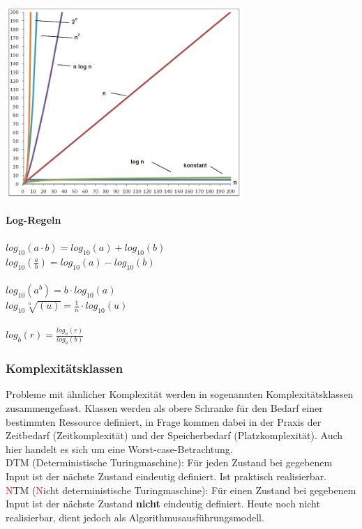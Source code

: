 \begin{minipage}{10cm}
\includegraphics[width=9cm]{images/Algorithmen/Wachstumsfunktionen.png}
\end{minipage}\qquad
\begin{minipage}{10cm}
\textbf{Log-Regeln}\\\\
$log_{10} (a \cdot b) = log_{10}(a)+log_{10}(b)$\\
$log_{10} (\frac{a}{b}) = log_{10}(a) - log_{10}(b)$\\ \\
$log_{10}(a^b) = b \cdot log_{10}(a)$\\
$log_{10}\sqrt[n]{(u)} = \frac{1}{n}\cdot log_{10}(u)$\\ \\
$log_{b}(r) = \frac{log_{a}(r)}{log_{a}(b)}$

\end{minipage}
\subsubsection{Komplexitätsklassen}
Probleme mit ähnlicher Komplexität werden in sogenannten Komplexitätsklassen zusammengefasst. Klassen werden als obere Schranke für den Bedarf einer bestimmten Ressource definiert, in Frage kommen dabei in der Praxis der Zeitbedarf (Zeitkomplexität) und der Speicherbedarf (Platzkomplexität). Auch hier handelt es sich um eine Worst-case-Betrachtung.\\

DTM (Deterministische Turingmaschine): Für jeden Zustand bei gegebenem Input ist der nächste Zustand eindeutig definiert. Ist praktisch realisierbar.\\

\textcolor{red}{N}TM (\textcolor{red}{N}icht deterministische Turingmaschine): Für einen Zustand bei gegebenem Input ist der nächste Zustand \textbf{nicht} eindeutig definiert. Heute noch nicht realisierbar, dient jedoch als Algorithmusausführungsmodell.\\

